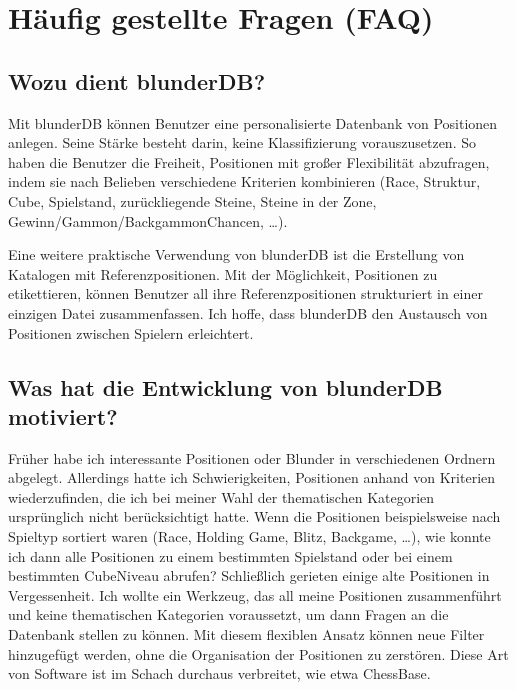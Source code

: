 \documentclass[letterpaper,10pt,german]{sphinxmanual}
\begin{document}
\sphinxstepscope


\section{Häufig gestellte Fragen (FAQ)}
\label{\detokenize{faq:foire-aux-questions}}\label{\detokenize{faq:faq}}\label{\detokenize{faq::doc}}

\subsection{Wozu dient blunderDB?}
\label{\detokenize{faq:quel-est-l-utilite-de-blunderdb}}
\sphinxAtStartPar
Mit blunderDB können Benutzer eine personalisierte Datenbank von Positionen anlegen. Seine Stärke besteht darin, keine Klassifizierung  vorauszusetzen. So haben die Benutzer die Freiheit, Positionen mit großer Flexibilität abzufragen, indem sie nach Belieben verschiedene Kriterien kombinieren (Race, Struktur, Cube, Spielstand, zurückliegende Steine, Steine in der Zone, Gewinn\sphinxhyphen{}/Gammon\sphinxhyphen{}/Backgammon\sphinxhyphen{}Chancen, …).

\sphinxAtStartPar
Eine weitere praktische Verwendung von blunderDB ist die Erstellung von Katalogen mit Referenzpositionen. Mit der Möglichkeit, Positionen zu etikettieren, können Benutzer all ihre Referenzpositionen strukturiert in einer einzigen Datei zusammenfassen. Ich hoffe, dass blunderDB den Austausch von Positionen zwischen Spielern erleichtert.


\subsection{Was hat die Entwicklung von blunderDB motiviert?}
\label{\detokenize{faq:qu-est-ce-qui-a-motive-la-creation-de-blunderdb}}
\sphinxAtStartPar
Früher habe ich interessante Positionen oder Blunder in verschiedenen Ordnern abgelegt. Allerdings hatte ich Schwierigkeiten, Positionen anhand von Kriterien wiederzufinden, die ich bei meiner Wahl der thematischen Kategorien ursprünglich nicht berücksichtigt hatte. Wenn die Positionen beispielsweise nach Spieltyp sortiert waren (Race, Holding Game, Blitz, Backgame, …), wie konnte ich dann alle Positionen zu einem bestimmten Spielstand oder bei einem bestimmten Cube\sphinxhyphen{}Niveau abrufen? Schließlich gerieten einige alte Positionen in Vergessenheit. Ich wollte ein Werkzeug, das all meine Positionen zusammenführt und keine thematischen Kategorien  voraussetzt, um dann Fragen an die Datenbank stellen zu können. Mit diesem flexiblen Ansatz können neue Filter hinzugefügt werden, ohne die Organisation der Positionen zu zerstören. Diese Art von Software ist im Schach durchaus verbreitet, wie etwa ChessBase.
\end{document}
